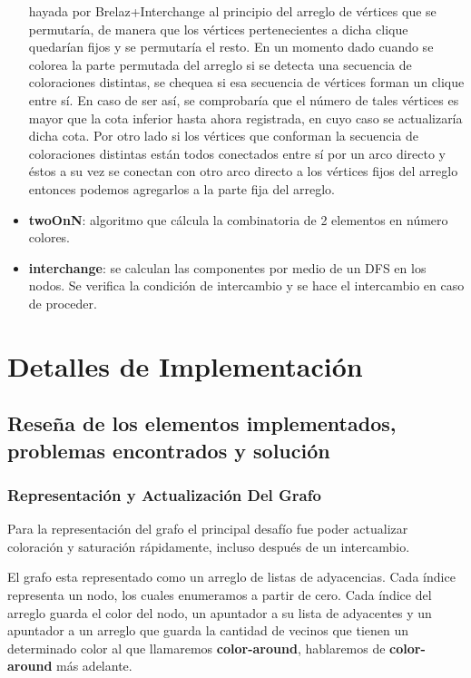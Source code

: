 \documentclass[a4paper,10pt]{article}
\begin{document}
\begin{itemize}
hayada por Brelaz+Interchange al principio del arreglo de vértices que se permutaría, de manera que los vértices 
pertenecientes a dicha clique quedarían fijos y se permutaría el resto. En un momento dado cuando se colorea la parte 
permutada del arreglo si se detecta una secuencia de coloraciones distintas, se chequea si esa secuencia de vértices forman un clique entre sí. En caso de ser así, se comprobaría que el número de tales vértices es mayor que la cota inferior hasta ahora registrada, en cuyo caso se actualizaría dicha cota. Por otro lado si los vértices que conforman la secuencia de coloraciones distintas están todos conectados entre sí por un arco directo y éstos a su vez se conectan con otro arco directo a los vértices fijos del arreglo entonces podemos agregarlos a la parte fija del arreglo.
\item \textbf{twoOnN}: algoritmo que cálcula la combinatoria de 2 elementos en número colores.
\item \textbf{interchange}: se calculan las componentes por medio de un DFS en los nodos. Se verifica la condición de intercambio 
y se hace el intercambio en caso de proceder.
\end{itemize}
\newpage
\section{Detalles de Implementación}

\subsection{Reseña de los elementos implementados, problemas encontrados y solución}

\subsubsection{Representación y Actualización Del Grafo}


Para la representación del grafo el principal desafío fue poder actualizar coloración y saturación rápidamente, incluso después de un intercambio.

El grafo esta representado como un arreglo de listas de adyacencias. Cada índice representa un nodo, los cuales enumeramos a partir de cero. Cada índice del arreglo guarda el color del nodo, un apuntador a su lista de adyacentes y un apuntador a un arreglo que guarda la cantidad de vecinos que tienen un determinado color al que llamaremos \textbf{color-around}, hablaremos de \textbf{color-around} más adelante.
\end{document}
